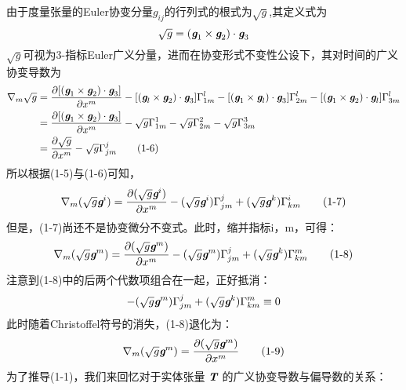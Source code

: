 \documentclass[UTF8]{ctexart}
\begin{document}
由于度量张量的Euler协变分量$g_{ij}$的行列式的根式为$\sqrt{g}$,其定义式为
\begin{equation*}
    \sqrt{g}=(\textit{\textbf{g}}_1 \times \textit{\textbf{g}}_2 )\cdot \textit{\textbf{g}}_3
\end{equation*}
$\sqrt{g}$可视为3-指标Euler广义分量，进而在协变形式不变性公设下，其对时间的广义协变导数为
\begin{align*}
    \nabla_m\sqrt{g}&= \frac{\partial[(\textit{\textbf{g}}_1 \times \textit{\textbf{g}}_2 )\cdot \textit{\textbf{g}}_3]}{\partial x^m}-[(\textit{\textbf{g}}_l \times \textit{\textbf{g}}_2 )\cdot \textit{\textbf{g}}_3]\Gamma_{1m}^{l}  -[(\textit{\textbf{g}}_1 \times \textit{\textbf{g}}_l )\cdot \textit{\textbf{g}}_3]\Gamma_{2m}^{l}  -[(\textit{\textbf{g}}_1 \times \textit{\textbf{g}}_2 )\cdot \textit{\textbf{g}}_l]\Gamma_{3m}^{l} \\
    &=\frac{\partial [(\textit{\textbf{g}}_1 \times \textit{\textbf{g}}_2 )\cdot \textit{\textbf{g}}_3]}{\partial x^m}-\sqrt{g}\Gamma_{1m}^1 -\sqrt{g}\Gamma_{2m}^2 -\sqrt{g}\Gamma_{3m}^3 \\
    &=\frac{\partial \sqrt{g}}{\partial x^m}-\sqrt{g}\Gamma_{jm}^j \tag{1-6}
\end{align*}
所以根据(1-5)与(1-6)可知，
\begin{equation*}
    \nabla_m(\sqrt{g}\textit{\textbf{g}}^i)=\frac{\partial (\sqrt{g}\textit{\textbf{g}}^i)}{\partial x^m}-(\sqrt{g}\textit{\textbf{g}}^i)\Gamma_{jm}^j+(\sqrt{g}\textit{\textbf{g}}^k)\Gamma_{km}^i\tag{1-7}
\end{equation*}
但是，(1-7)尚还不是协变微分不变式。此时，缩并指标i，m，可得：
\begin{equation*}
     \nabla_m(\sqrt{g}\textit{\textbf{g}}^m)=\frac{\partial (\sqrt{g}\textit{\textbf{g}}^m)}{\partial x^m}-(\sqrt{g}\textit{\textbf{g}}^m)\Gamma_{jm}^j+ (\sqrt{g}\textit{\textbf{g}}^k)\Gamma_{km}^m\tag{1-8}
\end{equation*}
注意到(1-8)中的后两个代数项组合在一起，正好抵消：
\begin{equation*}
    -(\sqrt{g}\textit{\textbf{g}}^m)\Gamma_{jm}^j+ (\sqrt{g}\textit{\textbf{g}}^k)\Gamma_{km}^m \equiv 0
\end{equation*}
此时随着Christoffel符号的消失，(1-8)退化为：
\begin{equation*}
     \nabla_m(\sqrt{g}\textit{\textbf{g}}^m)=\frac{\partial (\sqrt{g}\textit{\textbf{g}}^m)}{\partial x^m}\tag{1-9}
\end{equation*}
为了推导(1-1)，我们来回忆对于实体张量 $\textit{\textbf{T}} $ 的广义协变导数与偏导数的关系：
\end{document}
